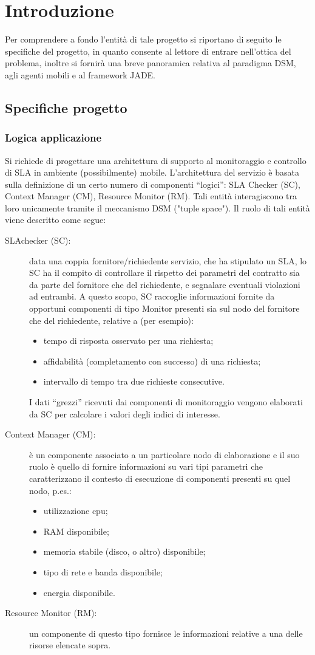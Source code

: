 \chapter{Introduzione}\label{cap:introduzione}
Per comprendere a fondo l'entità di tale progetto si riportano di seguito le specifiche del progetto, in quanto consente al lettore di entrare nell'ottica del problema, inoltre si fornirà una breve panoramica relativa al paradigma DSM, agli agenti mobili\cite{slide} e al framework JADE.
\section{Specifiche progetto}
\subsection{Logica applicazione}
Si richiede di progettare una architettura di supporto al monitoraggio e controllo di SLA in ambiente (possibilmente) mobile. L’architettura del servizio è basata sulla definizione di un certo numero di componenti “logici”: SLA Checker (SC), Context Manager (CM), Resource Monitor (RM). Tali entità interagiscono tra loro unicamente tramite il meccanismo DSM ("tuple space"). Il ruolo di tali entità viene descritto come segue:
\begin{description}
\item[SLAchecker (SC):] data una coppia fornitore/richiedente servizio, che ha stipulato un SLA, lo SC ha il compito di controllare il rispetto dei parametri del contratto sia da parte del fornitore che del richiedente, e segnalare eventuali violazioni ad entrambi. A questo scopo, SC raccoglie informazioni fornite da opportuni componenti di tipo Monitor presenti sia sul nodo del fornitore che del richiedente, relative a (per esempio):
\begin{itemize}
\item tempo di risposta osservato per una richiesta;
\item affidabilità (completamento con successo) di una richiesta;
\item intervallo di tempo tra due richieste consecutive.
\end{itemize}
I dati “grezzi” ricevuti dai componenti di monitoraggio vengono elaborati da SC per calcolare i valori degli indici di interesse.
\item[Context Manager (CM):] è un componente associato a un particolare nodo di elaborazione e il suo ruolo è quello di fornire informazioni su vari tipi parametri che caratterizzano il contesto di esecuzione di componenti presenti su quel nodo, p.es.:
\begin{itemize}
\item utilizzazione cpu;
\item RAM disponibile;
\item memoria stabile (disco, o altro) disponibile;
\item tipo di rete e banda disponibile;
\item energia disponibile.
\end{itemize}
\item[Resource Monitor (RM):] un componente di questo tipo fornisce le informazioni relative a una delle risorse elencate sopra.
\end{description}
